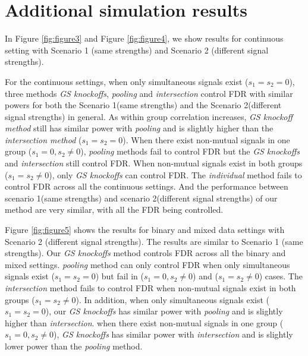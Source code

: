 \documentclass[11pt]{article}
\theoremstyle{plain}
\theoremstyle{definition}
\theoremstyle{remark}
\newcommand{\0}{\mathbf{0}}
\begin{document}
\section{Additional simulation results} \label{app:sim-res}
In Figure \ref{fig:figure3} and Figure \ref{fig:figure4}, we show results for continuous setting with Scenario 1 (same strengths) and Scenario 2 (different signal strengths). 

For the continuous settings, when only simultaneous signals exist ($s_1=s_2=0$), three methods \textit{GS knockoffs}, \textit{pooling} and \textit{intersection} control FDR with similar powers for both the Scenario 1(same strengths) and the Scenario 2(different signal strengths) in general. As within group correlation increases, \textit{GS knockoff method} still has similar power with \textit{pooling} and is slightly higher than the \textit{intersection method} ($s_1=s_2=0$). When there exist non-mutual signals in one group ($s_1=0,s_2 \neq0$), \textit{pooling} methods fail to control FDR but the \textit{GS knockoffs} and \textit{intersection} still control FDR. When non-mutual signals exist in both groups ($s_1=s_2 \neq 0$), only \textit{GS knockoffs} can control FDR. The \textit{individual} method fails to control FDR across all the continuous settings. And the performance between scenario 1(same strengths) and scenario 2(different signal strengths) of our method are very similar, with all the FDR being controlled. 

Figure \ref{fig:figure5} shows the results for binary and mixed data settings with Scenario 2 (different signal strengths). The results are similar to Scenario 1 (same strengths). Our \textit{GS knockoffs} method controls FDR across all the binary and mixed settings. \textit{pooling} method can only control FDR when only simultaneous signals exist ($s_1=s_2=0$) but fail in ($s_1=0,s_2 \neq0$) and ($s_1=s_2 \neq0$) cases. The \textit{intersection} method fails to control FDR when non-mutual signals exist in both groups ($s_1=s_2 \neq 0$). In addition, when only simultaneous signals exist ($s_1=s_2=0$), our \textit{GS knockoffs} has similar power with \textit{pooling} and is slightly higher than \textit{intersection}. when there exist non-mutual signals in one group ($s_1=0,s_2 \neq0$), \textit{GS knockoffs} has similar power with \textit{intersection} and is slightly lower power than the \textit{pooling} method.
\end{document}
